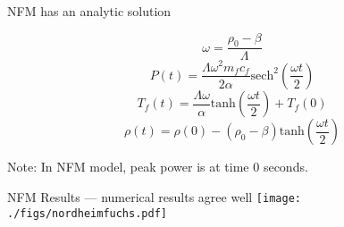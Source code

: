 \documentclass[serif]{beamer}
\begin{document}
\begin{frame}{NFM has an analytic solution}

  \begin{equation}
    \nonumber
    \omega = \frac{\rho_0 - \beta}{\Lambda}
    \end{equation}
\vfill
  \begin{equation}
    \nonumber
    P\left(t\right) = \frac{\Lambda\omega^2m_fc_f}{2\alpha}\mathrm{sech}^2\left(\frac{\omega t}{2}\right)
  \end{equation}
\vfill
  \begin{equation}
    \nonumber
    T_f\left(t\right) = \frac{\Lambda\omega}{\alpha}\mathrm{tanh}\left(\frac{\omega t}{2}\right) + T_f\left(0\right)
  \end{equation}
\vfill
  \begin{equation}
    \nonumber
    \rho\left(t\right) = \rho\left(0\right) - \left(\rho_0 - \beta\right)\mathrm{tanh}\left(\frac{\omega t}{2}\right)
  \end{equation}
\vfill
  \begin{center}
    \alert{Note:} In NFM model, peak power is at time 0 seconds.
  \end{center}

\end{frame}


\begin{frame}{NFM Results --- numerical results agree well}
  \texttt{[image: ./figs/nordheimfuchs.pdf]}
\end{frame}

\end{document}
